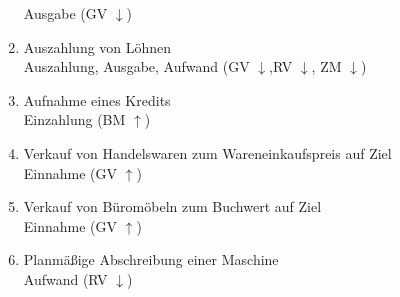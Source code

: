 \documentclass[paper=a4, fontsize=11pt]{scrartcl}
\numberwithin{equation}{section}
\numberwithin{figure}{section}
\numberwithin{table}{section}
\begin{document}
\begin{enumerate}
Ausgabe (GV $\downarrow$)
\item Auszahlung von Löhnen \\
Auszahlung, Ausgabe, Aufwand (GV $\downarrow$,RV $\downarrow$, ZM $\downarrow$)
\item Aufnahme eines Kredits \\
Einzahlung (BM $\uparrow$)
\item Verkauf von Handelswaren zum Wareneinkaufspreis auf Ziel \\
Einnahme (GV $\uparrow$)
\item Verkauf von Büromöbeln zum Buchwert auf Ziel \\
Einnahme (GV $\uparrow$)
\item Planmäßige Abschreibung einer Maschine \\
Aufwand (RV $\downarrow$)
\end{enumerate}

\end{document}
